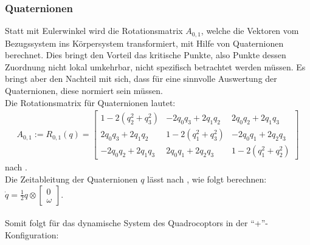 \subsubsection{Quaternionen}\label{subsub:Quaternionen}
Statt mit Eulerwinkel wird die Rotationsmatrix $A_{0, 1}$, welche die Vektoren vom Bezugssystem ins Körpersystem transformiert, mit Hilfe von Quaternionen berechnet. Dies bringt den Vorteil das kritische Punkte, also Punkte dessen Zuordnung nicht lokal umkehrbar, nicht spezifisch betrachtet werden müssen. Es bringt aber den Nachteil mit sich, dass für eine sinnvolle Auswertung der Quaternionen, diese normiert sein müssen.
\\
Die Rotationsmatrix für Quaternionen lautet: 
\begin{align}
A_{0, 1} := R_{0, 1}(q) = \left[ \begin{matrix} 1-2(q_2^2 + q_3^2) &
-2q_0q_3+2q_1q_2 &
2q_0q_2+2q_1q_3 \\
2q_0q_3+2q_1q_2 &
1-2(q_1^2 + q_3^2) &
-2q_0q_1+2q_2q_3 \\
-2q_0q_2+2q_1q_3 &
2q_0q_1+2q_2q_3 &
1-2(q_1^2 + q_2^2)
\end{matrix}
\right]
\end{align}
nach \cite{Richter2009}.\\ 
Die Zeitableitung der Quaternionen $q$ lässt nach \cite{Chou1992}, wie folgt berechnen: $\dot q = \frac{1}{2} q \otimes \begin{bmatrix} 0 \\ \omega \end{bmatrix}$. \\
\\
Somit folgt für das dynamische System des Quadrocoptors in der ``+''- Konfiguration:
